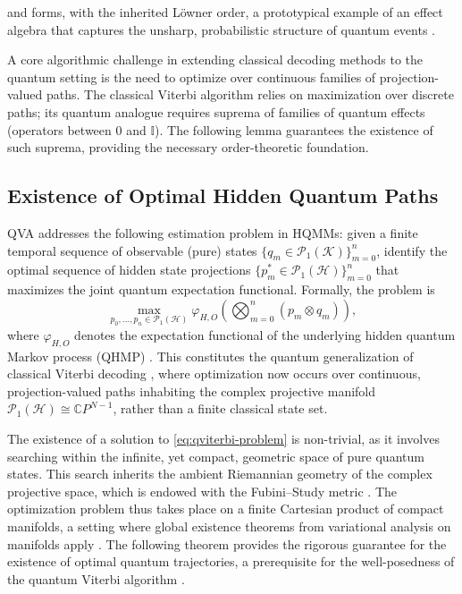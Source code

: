 \documentclass[12pt, reco]{article}
\begin{document}
and forms, with the inherited L\"owner order, a prototypical example of an effect algebra that captures the unsharp, probabilistic structure of quantum events \cite{MilP07}.

A core algorithmic challenge in extending classical decoding methods to the quantum setting is the need to optimize over continuous families of projection-valued paths. The classical Viterbi algorithm \cite{V03, FV05, Shi2021} relies on maximization over discrete paths; its quantum analogue requires suprema of families of quantum effects (operators between $0$ and $\mathbb{I}$). The following lemma guarantees the existence of such suprema, providing the necessary order-theoretic foundation.

 


\subsection{Existence of Optimal Hidden Quantum Paths}
\label{subsec:optimal-existence}

 QVA addresses the following  estimation problem in  HQMMs: given a finite temporal sequence of observable (pure) states \(\{q_m \in \mathcal{P}_1(\mathcal{K})\}_{m=0}^n\), identify the optimal sequence of hidden state projections \(\{p_m^* \in \mathcal{P}_1(\mathcal{H})\}_{m=0}^n\) that maximizes the joint quantum expectation functional. Formally, the problem is
\begin{equation}\label{eq:qviterbi-problem}
\max_{p_0,\dots,p_n \in \mathcal{P}_1(\mathcal{H})} \varphi_{H,O}\left(\bigotimes_{m=0}^{n} (p_m \otimes q_m)\right),
\end{equation}
where \(\varphi_{H,O}\) denotes the expectation functional of the underlying hidden quantum Markov process (QHMP) \cite{ASS20, AGLS24Q}. This constitutes the quantum generalization of classical Viterbi decoding \cite{V03, FV05}, where optimization now occurs over continuous, projection-valued paths inhabiting the complex projective manifold \(\mathcal{P}_1(\mathcal{H}) \cong \mathbb{C}P^{N-1}\), rather than a finite classical state set.

The existence of a solution to \eqref{eq:qviterbi-problem} is non-trivial, as it involves searching within the infinite, yet compact, geometric space of pure quantum states. This search inherits the ambient Riemannian geometry of the complex projective space, which is endowed with the Fubini–Study metric \cite{Nielsen2000}. The optimization problem thus takes place on a finite Cartesian product of compact   manifolds, a setting where global existence theorems from variational analysis on manifolds apply \cite{ticozzi2008}. The following theorem provides the rigorous guarantee for the existence of optimal quantum trajectories, a prerequisite for the well-posedness of the quantum Viterbi algorithm \cite{Li2024, MRDFS22}.
\end{document}
